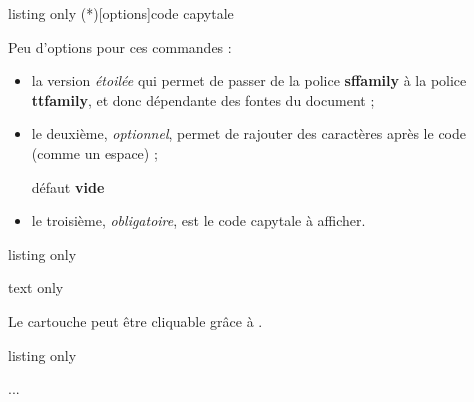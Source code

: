 \documentclass[a4paper,french,11pt]{article}
\newcommand\ctex[1]{\tcbox[vignettelatex]{#1}}
\newcommand\Cle[1]{{\bfseries\sffamily\textlangle #1\textrangle}}
\begin{document}
\begin{PresCodeTexPL}{listing only}
\CartoucheCapytale(*)[options]{code capytale}
\end{PresCodeTexPL}

\begin{cautionblock}
Peu d'options pour ces commandes :

\begin{itemize}
	\item la version \textit{étoilée} qui permet de  passer de la police \Cle{sffamily} à la police \Cle{ttfamily}, et donc dépendante des fontes du document ;
	\item le deuxième, \textit{optionnel}, permet de rajouter des caractères après le code (comme un \textsf{espace}) ;
	
	\hfill{}défaut \Cle{vide}
	\item le troisième, \textit{obligatoire}, est le \textsf{code capytale} à afficher.
\end{itemize}
\vspace*{-\baselineskip}\leavevmode
\end{cautionblock}

\begin{PresCodeTexPL}{listing only}



\end{PresCodeTexPL}

\begin{PresCodeSortiePL}{text only}



\end{PresCodeSortiePL}

\begin{noteblock}
Le \textsf{cartouche} peut être \og cliquable \fg{} grâce à \ctex{href}.
\end{noteblock}

\begin{PresCodeTexPL}{listing only}
\usepackage{hyperref}
...
\href{https://capytale2.ac-paris.fr/web/c/abcd-12345}{}
\end{PresCodeTexPL}
\end{document}
